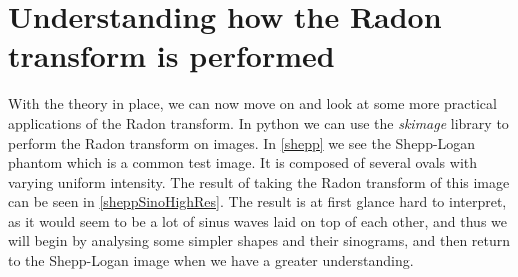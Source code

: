 \section{Understanding how the Radon transform is performed}
With the theory in place, we can now move on and look at some more practical applications of the Radon transform. In python we can use the \textit{skimage} library to perform the Radon transform on images. In \autoref{shepp} we see the Shepp-Logan phantom which is a common test image. It is composed of several ovals with varying uniform intensity. The result of taking the Radon transform of this image can be seen in \autoref{sheppSinoHighRes}. The result is at first glance hard to interpret, as it would seem to be a lot of sinus waves laid on top of each other, and thus we will begin by analysing some simpler shapes and their sinograms, and then return to the Shepp-Logan image when we have a greater understanding.\\
